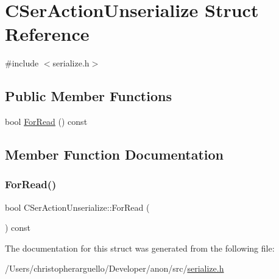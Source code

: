 \hypertarget{struct_c_ser_action_unserialize}{}\section{C\+Ser\+Action\+Unserialize Struct Reference}
\label{struct_c_ser_action_unserialize}


{\ttfamily \#include $<$serialize.\+h$>$}

\subsection*{Public Member Functions}
\begin{DoxyCompactItemize}
\item 
bool \mbox{\hyperlink{struct_c_ser_action_unserialize_aa160459633ad25c544f43de0bbc7c4e7}{For\+Read}} () const
\end{DoxyCompactItemize}


\subsection{Member Function Documentation}
\mbox{\label{struct_c_ser_action_unserialize_aa160459633ad25c544f43de0bbc7c4e7}} 
\subsubsection{\texorpdfstring{For\+Read()}{ForRead()}}
{\footnotesize\ttfamily bool C\+Ser\+Action\+Unserialize\+::\+For\+Read (\begin{DoxyParamCaption}{ }\end{DoxyParamCaption}) const\hspace{0.3cm}{\ttfamily [inline]}}



The documentation for this struct was generated from the following file\+:\begin{DoxyCompactItemize}
\item 
/\+Users/christopherarguello/\+Developer/anon/src/\mbox{\hyperlink{serialize_8h}{serialize.\+h}}\end{DoxyCompactItemize}
